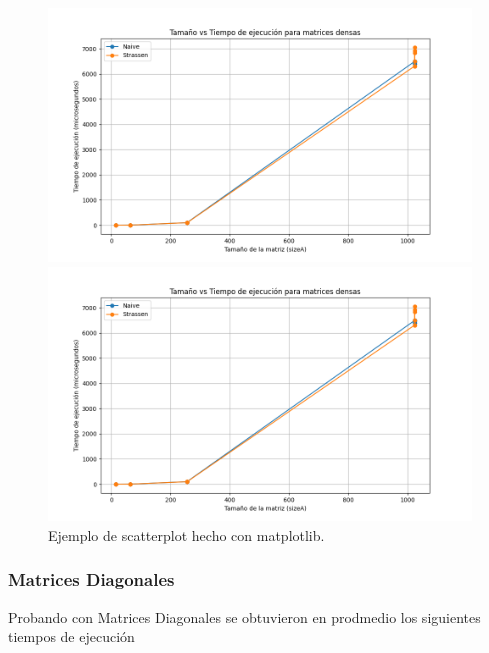 \begin{figure}[H]
    \centering
    \begin{minipage}[t]{0.5\textwidth}
        \includegraphics[width=\textwidth]{../code/matrix_multiplication/data/plots/dense_matrices_plot.png}
    \end{minipage}%
    \begin{minipage}[t]{0.5\textwidth}
        \includegraphics[width=\textwidth]{../code/matrix_multiplication/data/plots/dense_matrices_plot.png}
     \end{minipage}%
    \caption{Ejemplo de scatterplot hecho con matplotlib.}
    \label{fig:multi_densa}
\end{figure}

\subsubsection*{Matrices Diagonales}

Probando con Matrices Diagonales  se obtuvieron en prodmedio los siguientes tiempos de ejecución

